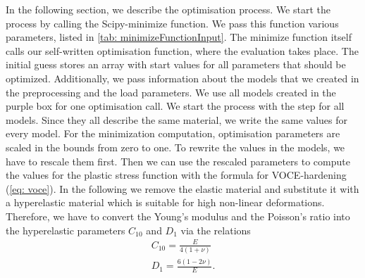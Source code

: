 In the following section, we describe the optimisation process. We start the process by calling the Scipy-minimize function. We pass this function various parameters, listed in \autoref{tab: minimizeFunctionInput}. The minimize function itself calls our self-written optimisation function, where the evaluation takes place. The initial guess stores an array with start values for all parameters that should be optimized. Additionally, we pass information about the models that we created in the preprocessing and the load parameters. We use all models created in the purple box for one optimisation call.
We start the process with the step  for all models. Since they all describe the same material, we write the same values for every model. For the minimization computation, optimisation parameters are scaled in the bounds from zero to one. To rewrite the values in the models, we have to rescale them first. Then we can use the rescaled parameters to compute the values for the plastic stress function with the formula for VOCE-hardening (\autoref{eq: voce}). In the following we remove the elastic material and substitute it with a hyperelastic material which is suitable for high non-linear deformations. Therefore, we have to convert the Young's modulus and the Poisson's ratio into the hyperelastic parameters $C_{10}$ and $D_1$ via the relations
\begin{gather}
    C_{10} = \frac{E}{4(1+ \nu)} \\
    D_1 = \frac{6(1-2\nu)}{E}.
\end{gather}

